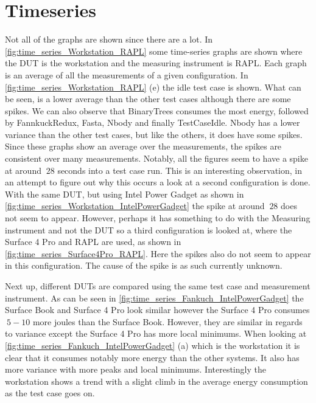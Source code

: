 \section{Timeseries}\label{sec:timeseries}


Not all of the graphs are shown since there are a lot. In \cref{fig:time_series_Workstation_RAPL} some time-series graphs are shown where the DUT is the workstation and the measuring instrument is RAPL. Each graph is an average of all the measurements of a given configuration. In \cref{fig:time_series_Workstation_RAPL} (e) the idle test case is shown. What can be seen, is a lower average than the other test cases although there are some spikes. We can also observe that BinaryTrees consumes the most energy, followed by FannkuckRedux, Fasta, Nbody and finally TestCaseIdle. Nbody has a lower variance than the other test cases, but like the others, it does have some spikes. Since these graphs show an average over the measurements, the spikes are consistent over many measurements. Notably, all the figures seem to have a spike at around $~28$ seconds into a test case run. This is an interesting observation, in an attempt to figure out why this occurs a look at a second configuration is done. With the same DUT, but using Intel Power Gadget as shown in \cref{fig:time_series_Workstation_IntelPowerGadget} the spike at around $~28$ does not seem to appear. However, perhaps it has something to do with the Measuring instrument and not the DUT so a third configuration is looked at, where the Surface 4 Pro and RAPL are used, as shown in \cref{fig:time_series_Surface4Pro_RAPL}. Here the spikes also do not seem to appear in this configuration. The cause of the spike is as such currently unknown.


%
%


%

Next up, different DUTs are compared using the same test case and measurement instrument. As can be seen in \cref{fig:time_series_Fankuch_IntelPowerGadget} the Surface Book and Surface 4 Pro look similar however the Surface 4 Pro consumes $~5-10$ more joules than the Surface Book. However, they are similar in regards to variance except the Surface 4 Pro has more local minimums. When looking at \cref{fig:time_series_Fankuch_IntelPowerGadget} (a) which is the workstation it is clear that it consumes notably more energy than the other systems. It also has more variance with more peaks and local minimums. Interestingly the workstation shows a trend with a slight climb in the average energy consumption as the test case goes on.


